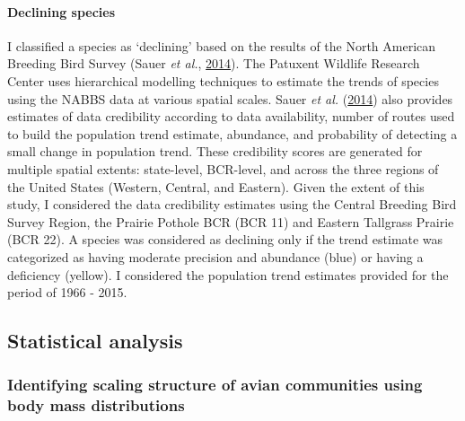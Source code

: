 \documentclass[12pt,twoside,openany]{reedthesis}
\begin{document}
\hypertarget{declining-species}{%
\paragraph{Declining species}\label{declining-species}}

I classified a species as `declining' based on the results of the North American Breeding Bird Survey (Sauer \emph{et al.}, \protect\hyperlink{ref-sauer2017results}{2014}). The Patuxent Wildlife Research Center uses hierarchical modelling techniques to estimate the trends of species using the NABBS data at various spatial scales. Sauer \emph{et al.} (\protect\hyperlink{ref-sauer2017results}{2014}) also provides estimates of data credibility according to data availability, number of routes used to build the population trend estimate, abundance, and probability of detecting a small change in population trend. These credibility scores are generated for multiple spatial extents: state-level, BCR-level, and across the three regions of the United States (Western, Central, and Eastern). Given the extent of this study, I considered the data credibility estimates using the Central Breeding Bird Survey Region, the Prairie Pothole BCR (BCR 11) and Eastern Tallgrass Prairie (BCR 22). A species was considered as declining only if the trend estimate was categorized as having moderate precision and abundance (blue) or having a deficiency (yellow). I considered the population trend estimates provided for the period of 1966 - 2015.

\hypertarget{statistical-analysis}{%
\subsection{Statistical analysis}\label{statistical-analysis}}

\hypertarget{identifying-scaling-structure-of-avian-communities-using-body-mass-distributions}{%
\subsubsection{Identifying scaling structure of avian communities using body mass distributions}\label{identifying-scaling-structure-of-avian-communities-using-body-mass-distributions}}
\end{document}
